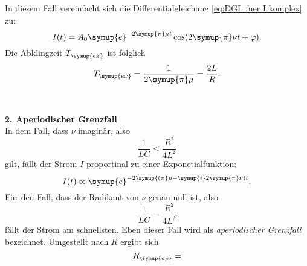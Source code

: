 In diesem Fall vereinfacht sich die Differentialgleichung \eqref{eq:DGL fuer I komplex} zu:
\begin{equation*}
    I(t)=A_{0} \symup{e}^{-2\symup{\pi}\mu t} \cos(2\symup{\pi}\nu t + \varphi).
\end{equation*}
Die Abklingzeit $T_{\symup{ex}}$ ist folglich
\begin{equation}
    T_{\symup{ex}}=\frac{1}{2\symup{\pi}\mu}=\frac{2L}{R}.
    \label{eq:Abklingzeit}
\end{equation}
\\
\\
\textbf{2. Aperiodischer Grenzfall} \\
In dem Fall, dass $\nu$ imaginär, also
\begin{equation*}
    \frac{1}{LC} < \frac{R^{2}}{4L^{2}}
\end{equation*}
gilt, fällt der Strom $I$ proportinal zu einer Exponetialfunktion:
\begin{equation*}
    I(t) \propto \symup{e}^{-2\symup{(\pi}\mu-\symup{i}2\symup{\pi}\nu)t}.
\end{equation*}
Für den Fall, dass der Radikant von $\nu$ genau null ist, also
\begin{equation*}
    \frac{1}{LC} = \frac{R^{2}}{4L^{2}}
\end{equation*}
fällt der Strom am schnellsten. Eben dieser Fall wird als \textit{aperiodischer Grenzfall} bezeichnet. Umgestellt nach $R$ ergibt sich
\begin{equation}
    R_{\symup{ap}} = 
\end{equation}
